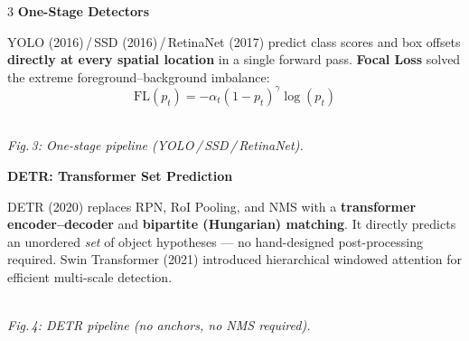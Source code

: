 \documentclass[10pt]{article} %
\renewcommand{\small}       {\fontsize{18pt}{23pt}\selectfont}
\renewcommand{\large}       {\fontsize{27pt}{33pt}\selectfont}
\begin{document}
\begin{multicols}{3}
\medskip
{\large\bfseries One-Stage Detectors}

\smallskip
YOLO (2016)\,/\,SSD (2016)\,/\,RetinaNet (2017) predict class scores
and box offsets \textbf{directly at every spatial location} in a
single forward pass.  \textbf{Focal Loss} solved the extreme
foreground--background imbalance:
\[
  \mathrm{FL}(p_t)=-\alpha_t(1-p_t)^{\gamma}\log(p_t)
\]

\begin{center}
\\[5pt]
{\small\textit{Fig.\,3: One-stage pipeline (YOLO\,/\,SSD\,/\,RetinaNet).}}
\end{center}

\medskip
{\large\bfseries DETR: Transformer Set Prediction}

\smallskip
DETR (2020) replaces RPN, RoI Pooling, and NMS with a
\textbf{transformer encoder--decoder} and \textbf{bipartite
(Hungarian) matching}.  It directly predicts an unordered \emph{set}
of object hypotheses --- no hand-designed post-processing required.
Swin Transformer (2021) introduced hierarchical windowed attention for
efficient multi-scale detection.

\begin{center}
\\[5pt]
{\small\textit{Fig.\,4: DETR pipeline (no anchors, no NMS required).}}
\end{center}


\end{multicols}
\end{document}
